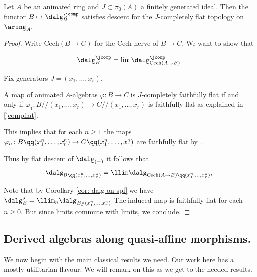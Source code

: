 \documentclass[10pt,reqno]{amsart}
\numberwithin{equation}{section}
\begin{document}
\begin{corollary}
    Let $A$ be an animated ring and $J\subset \pi_0(A)$ a finitely generated ideal. Then the functor $B\mapsto \dalg^\jcomp_B$ satisfies descent for the $J$-completely flat topology on $\aring_A.$ 
\end{corollary}
\begin{proof}
Write $\mathrm{Cech}(B\to C)$ for the Cech nerve of $B\to C$. We want to show that 

$$\dalg^\jcomp_B=\lim \dalg^\jcomp_{\mathrm{Cech}{(A\to B)}}$$

Fix generators $J=(x_1,\ldots, x_r).$ 

A map of animated $A$-algebras $\varphi\colon B\to C$ is $J$-completely faithfully flat if and only if $\varphi_1\colon B/\!\!/(x_1,\ldots, x_r)\to C/\!\!/(x_1,\ldots, x_r)$ is faithfully flat as explained in \ref{jcompflat}. 

This implies that for each $n\geq 1$ the maps $\varphi_n\colon B\qq (x_1^n,\ldots, x_r^n)\to C\qq (x_1^n,\ldots, x_r^n)$ are faithfully flat by \cite[Lemma 5.2.2]{CesnaviciusScholze2024FlatPurity}.

Thus by flat descent of $\dalg_{(-)}$ it follows that $$\dalg_{B\qq (x_1^n,\ldots, x_r^n)}=\llim \dalg_{\mathrm{Cech}(A\to B)\qq (x_1^n,\ldots, x_r^n)},$$

Note that by Corollary \ref{cor: dalg on spf} we have $\dalg_B^J=\llim_n \dalg_{B/\!\!/(x^n_1,\ldots, x^n_r)}$ 
The induced map  is faithfully flat for each $n\geq 0$. But since limits commute with limits, we conclude.
    
\end{proof}
\subsection{Derived algebras along quasi-affine morphisms.}\label{sec: dalg along qaff}


We now begin with the main classical results we need. Our work here has a mostly utilitarian flavour. We will remark on this as we get to the needed results. 
\end{document}
